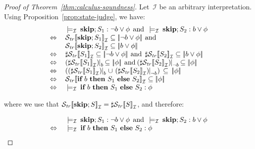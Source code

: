 \documentclass[10pt,a4paper]{amsart}
\theoremstyle{definition}
\newcommand{\denot}[1]{\left[\!\left[#1\right]\!\right]}
\newcommand{\fdenot}[1]{\left|\!\left|#1\right|\!\right|}
\newcommand{\trcdenoti}[1]{\mathcal{S}_{\mathit{tr}}\!\denot{#1}_{\mathcal{I}}}
\newcommand{\restr}[2]{\!\!\mid_{#1}^{#2}}
\newcommand{\Skip}{\mbox{\bf skip}}
\newcommand{\If}{\mbox{\bf if}}
\newcommand{\Then}{\mbox{\bf then}}
\newcommand{\Else}{\mbox{\bf else}}
\newcommand{\judge}[2]{#1 : #2}
\newcommand{\semsequenti}[2]{#1 \>\models_\mathcal{I}\> #2}
\begin{document}
\begin{proof}[Proof of Theorem~\ref{thm:calculus-soundness}]
  Let~$\mathcal{I}$ be an arbitrary interpretation.
  Using Proposition~\ref{prop:state-judge}, we have: 
  \[
    \begin{array}{ll}
      & 
        \semsequenti{}{\judge{\Skip; S_1}{\lnot b \lor \phi}} \>\>\text{and}\>
        \semsequenti{}{\judge{\Skip; S_2}{b \lor \phi}} \\
      \Leftrightarrow\> & 
                          \trcdenoti{\Skip; S_1} \subseteq \fdenot{\lnot b \lor \phi}
                          \>\text{and}\>\\
      &
        \trcdenoti{\Skip; S_2} \subseteq \fdenot{b \lor \phi}  \\
      \Leftrightarrow & 
                        \sharp \trcdenoti{S_1} \subseteq \fdenot{\lnot b \lor \phi} 
                        \>\text{and}\>\>
                        \sharp \trcdenoti{S_2} \subseteq \fdenot{b \lor \phi}  \\
      \Leftrightarrow & 
                        (\sharp \trcdenoti{S_1}) \restr{b}{} \,\subseteq \fdenot{\phi}
                        \>\text{and}\>
                        (\sharp \trcdenoti{S_2}) \restr{\lnot b}{} \,\subseteq \fdenot{\phi} \\
      \Leftrightarrow & 
                        \left((\sharp \trcdenoti{S_1}) \restr{b}{} \cup\
                        (\sharp \trcdenoti{S_2}) \restr{\lnot b}{}\right)
                        \,\subseteq\,
                        \fdenot{\phi}  \\
      \Leftrightarrow\> & 
                          \trcdenoti{\If\ b\ \Then\ S_1\ \Else\ S_2} \subseteq \fdenot{\phi} \\
      \Leftrightarrow & 
                        \semsequenti{}{\judge{\If\ b\ \Then\ S_1\ \Else\ S_2}{\phi}} 
    \end{array}
  \]

  \noindent
  where we use that
  $\trcdenoti{\Skip; S} = \sharp \trcdenoti{S}$, and therefore:

  \[
    \begin{array}{ll}
     & \semsequenti{}{\judge{\Skip; S_1}{\lnot b \lor \phi}} \>\>\text{and}\>
      \semsequenti{}{\judge{\Skip; S_2}{b \lor \phi}}\\
  \Leftrightarrow\> & 
      \semsequenti{}{\judge{\If\ b\ \Then\ S_1\ \Else\ S_2}{\phi}}
    \end{array}
  \]


\end{proof}
\end{document}
